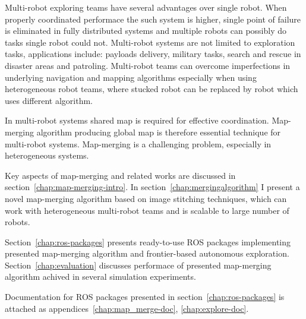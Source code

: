 
Multi-robot exploring teams have several advantages over single robot. When properly coordinated performace the such system is higher, single point of failure is eliminated in fully distributed systems and multiple robots can possibly do tasks single robot could not. Multi-robot systems are not limited to exploration tasks, applications include: payloads delivery, military tasks, search and rescue in disaster areas and patroling. Multi-robot teams can overcome imperfections in underlying navigation and mapping algorithms especially when using heterogeneous robot teams, where stucked robot can be replaced by robot which uses different algorithm.

In multi-robot systems shared map is required for effective coordination. Map-merging algorithm producing global map is therefore essential technique for multi-robot systems. Map-merging is a challenging problem, especially in heterogeneous systems.

Key aspects of map-merging and related works are discussed in section~\ref{chap:map-merging-intro}. In section~\ref{chap:mergingalgorithm} I present a novel map-merging algorithm based on image stitching techniques, which can work with heterogeneous multi-robot teams and is scalable to large number of robots.

Section~\ref{chap:ros-packages} presents ready-to-use \gls{ROS} packages implementing presented map-merging algorithm and frontier-based autonomous exploration. Section~\ref{chap:evaluation} discusses performace of presented map-merging algorithm achived in several simulation experiments.

Documentation for \gls{ROS} packages presented in section~\ref{chap:ros-packages} is attached as appendices~\ref{chap:map_merge-doc}, \ref{chap:explore-doc}.
